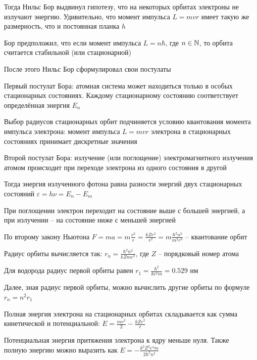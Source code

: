 \documentclass[12pt]{article}
\begin{document}
Тогда Нильс Бор выдвинул гипотезу, что на некоторых орбитах электроны не излучают энергию. Удивительно, что момент импульса $L = m v r$ имеет такую же размерность, что и постоянная планка $h$

Бор предположил, что если момент импульса $L = n \hbar$, где $n \in \mathbb{N}$, то орбита считается стабильной (или стационарной)








После этого Нильс Бор сформулировал свои постулаты

Первый постулат Бора: атомная система может находиться только в особых стационарных состояниях. Каждому стационарному состоянию соответствует определённая энергия $E_n$

Выбор радиусов стационарных орбит подчиняется условию квантования момента импульса электрона: момент импульса $L = m v r$ электрона в стационарных состояниях принимает дискретные значения

Второй постулат Бора: излучение (или поглощение) электромагнитного излучения атомом происходит при переходе электрона из одного состояния в другой

Тогда энергия излученного фотона равна разности энергий двух стационарных состояний $\varepsilon = h \nu = E_n - E_m$

При поглощении электрон переходит на состояние выше с большей энергией, а при излучении -- на состояние ниже с меньшей энергией

По второму закону Ньютона $F = m a = m \frac{v^2}{r} = \frac{k Z e^2}{r^2} = m \frac{\hbar^2 n^2}{m^2 r^3}$ -- квантование орбит 

Радиус орбиты вычисляется так: $r_n = \frac{\hbar^2 n^2}{k Z m e^2}$, где $Z$ -- порядковый номер атома

Для водорода радиус первой орбиты равен $r_1 = \frac{\hbar^2}{k e^2 m} = 0.529$ нм

Далее, зная радиус первой орбиты, можно вычислить другие орбиты по формуле $r_n = n^2 r_1$


\smallvspace

Полная энергия электрона на стационарных орбитах складывается как сумма кинетической и потенциальной: $E = \frac{m v^2}{2} - \frac{k Z e^2}{r}$

Потенциальная энергия притяжения электрона к ядру меньше нуля. Также полную энергию можно выразить как $E = -\frac{k^2 Z^2 e^4 m}{2 \hbar^2 n^2}$
\end{document}
